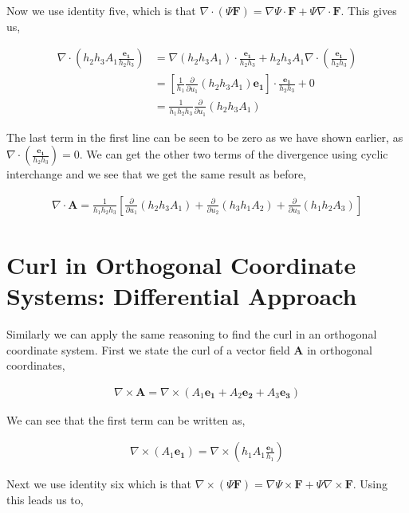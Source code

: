 \documentclass[11pt]{amsart}
\begin{document}
Now we use identity five, which is that $\nabla\cdot(\Psi\mathbf{F})=\nabla\Psi\cdot\mathbf{F}+\Psi\nabla\cdot\mathbf{F}$. This gives us,

\begin{align*}
  \nabla\cdot\left(h_2h_3A_1\frac{\mathbf{e_1}}{h_2h_3}\right)&=\nabla(h_2h_3A_1)\cdot\frac{\mathbf{e_1}}{h_2h_3}+h_2h_3A_1\nabla\cdot\left(\frac{\mathbf{e_1}}{h_2h_3}\right) \\
                                                              &=\left[\frac{1}{h_1}\frac{\partial}{\partial u_1}(h_2h_3A_1)\mathbf{e_1}\right]\cdot\frac{\mathbf{e_1}}{h_2h_3} + 0 \\
                                                              &=\frac{1}{h_1h_2h_3}\frac{\partial}{\partial u_1}(h_2h_3A_1)
\end{align*}

The last term in the first line can be seen to be zero as we have shown earlier, as $\nabla\cdot\left(\frac{\mathbf{e_1}}{h_2h_3}\right) = 0$. We can get the other two terms of the divergence using cyclic interchange and we see that we get the same result as before,

\begin{align*}
  \nabla\cdot\mathbf{A}=\frac{1}{h_1h_2h_3}\left[\frac{\partial}{\partial u_1}(h_2h_3A_1)+\frac{\partial}{\partial u_2}(h_3h_1A_2)+\frac{\partial}{\partial u_3}(h_1h_2A_3)\right]
\end{align*}


\section{Curl in Orthogonal Coordinate Systems: Differential Approach}

Similarly we can apply the same reasoning to find the curl in an orthogonal coordinate system. First we state the curl of a vector field $\mathbf{A}$ in orthogonal coordinates,

\begin{align*}
  \nabla\times\mathbf{A}=\nabla\times(A_1\mathbf{e_1}+A_2\mathbf{e_2}+A_3\mathbf{e_3})
\end{align*}

We can see that the first term can be written as,

\begin{align*}
  \nabla\times(A_1\mathbf{e_1})=\nabla\times(h_1A_1\frac{\mathbf{e_1}}{h_1})
\end{align*}

Next we use identity six which is that $\nabla\times(\Psi\mathbf{F}) = \nabla\Psi\times\mathbf{F} + \Psi\nabla\times\mathbf{F}$. Using this leads us to,
\end{document}
